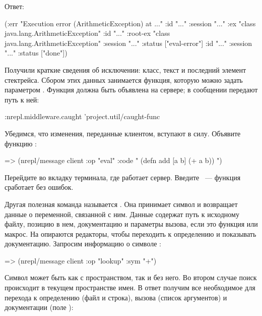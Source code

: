 Ответ:

\begin{english}
  \begin{clojure}
({:err "Execution error (ArithmeticException) at ..."
  :id "..."
  :session "..."}
 {:ex "class java.lang.ArithmeticException"
  :id "..."
  :root-ex "class java.lang.ArithmeticException"
  :session "..."
  :status ["eval-error"]}
 {:id "..."
  :session "..."
  :status ["done"]})
  \end{clojure}
\end{english}

Получили краткие сведения об исключении: класс, текст и последний элемент стектрейса. Сбором этих данных занимается функция, которую можно задать параметром . Функция должна быть объявлена на сервере; в сообщении передают путь к ней:

\begin{english}
  \begin{clojure}
{:nrepl.middleware.caught 'project.util/caught-func}
  \end{clojure}
\end{english}

Убедимся, что изменения, переданные клиентом, вступают в силу. Объявите функцию :

\begin{english}
  \begin{clojure}
=> (nrepl/message client {:op "eval" :code "
(defn add [a b]
  (+ a b))
"})
  \end{clojure}
\end{english}

Перейдите во вкладку терминала, где работает сервер. Введите ~--- функция сработает без ошибок.

Другая полезная команда называется . Она принимает символ и возвращает данные о переменной, связанной с ним. Данные содержат путь к исходному файлу, позицию в нем, документацию и параметры вызова, если это функция или макрос. На  опираются редакторы, чтобы переходить к определению и показывать документацию. Запросим информацию о символе \code{+}:

\begin{english}
  \begin{clojure}
=> (nrepl/message client {:op "lookup" :sym "+"})
  \end{clojure}
\end{english}

Символ может быть как с пространством, так и без него. Во втором случае поиск происходит в текущем пространстве имен. В ответ получим все необходимое для перехода к определению (файл и строка), вызова (список аргументов) и документации (поле ):

